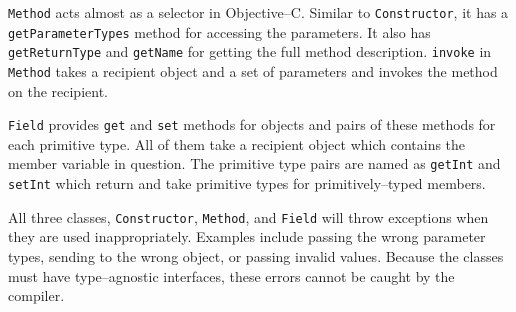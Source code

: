 	\texttt{Method} acts almost as a selector in Objective--C.  Similar to \texttt{Constructor}, it has a \texttt{get\-Par\-am\-et\-er\-T\-yp\-es} method for accessing the parameters.  It also has \texttt{getReturnType} and \texttt{getName} for getting the full method description.  \texttt{invoke} in \texttt{Method} takes a recipient object and a set of parameters and invokes the method on the recipient.

	\texttt{Field} provides \texttt{get} and \texttt{set} methods for objects and pairs of these methods for each primitive type.  All of them take a recipient object which contains the member variable in question.  The primitive type pairs are named as \texttt{getInt} and \texttt{setInt} which return and take primitive types for primitively--typed members.

	All three classes, \texttt{Constructor}, \texttt{Method}, and \texttt{Field} will throw exceptions when they are used inappropriately.  Examples include passing the wrong parameter types, sending to the wrong object, or passing invalid values.  Because the classes must have type--agnostic interfaces, these errors cannot be caught by the compiler.

